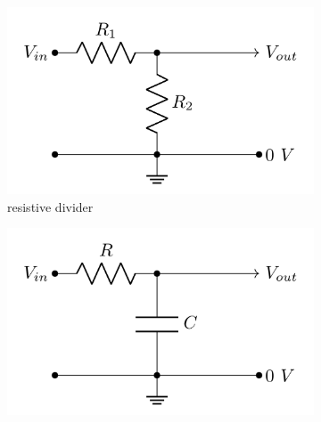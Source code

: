 \documentclass[10pt]{PhysLab1C} %
\begin{document}
\begin{figure}[ht]
\centering
\begin{subfigure}[t]{0.3\textwidth}
\centering
\includegraphics[width=\textwidth]{lab3fig/r-divider.png}

 \caption{resistive divider}
 \label{r-divider}
 \end{subfigure}
 \hspace{1.1cm}%
 \begin{subfigure}[t]{0.3\textwidth}
\centering
\includegraphics[width=\textwidth]{lab3fig/low-pass-2.png}


\end{subfigure}
\end{figure}
\end{document}
